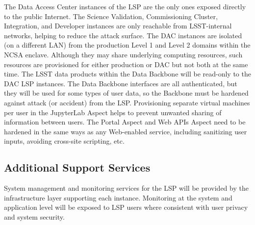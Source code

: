 The Data Access Center instances of the LSP are the only ones exposed directly
to the public Internet.  The Science Validation, Commissioning Cluster,
Integration, and Developer instances are only reachable from LSST-internal
networks, helping to reduce the attack surface.  The DAC instances are isolated
(on a different LAN) from the production Level 1 and Level 2 domains within the
NCSA enclave.  Although they may share underlying computing resources, such
resources are provisioned for either production or DAC but not both at the
same time.  The LSST data products within the Data Backbone will be read-only
to the DAC LSP instances.  The Data Backbone interfaces are all authenticated,
but they will be used for some types of user data, so the Backbone must be
hardened against attack (or accident) from the LSP.  Provisioning separate
virtual machines per user in the JupyterLab Aspect helps to prevent unwanted
sharing of information between users.  The Portal Aspect and Web APIs Aspect
need to be hardened in the same ways as any Web-enabled service, including
sanitizing user inputs, avoiding cross-site scripting, etc.

\subsection{Additional Support Services}\label{additional-support-services}

System management and monitoring services for the LSP will be provided by the
infrastructure layer supporting each instance.  Monitoring at the system and
application level will be exposed to LSP users where consistent with user
privacy and system security.
